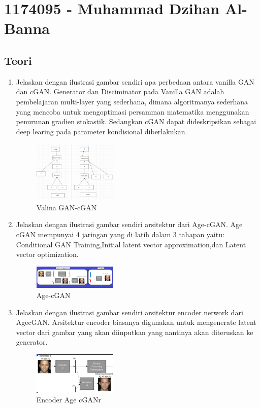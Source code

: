 \section{1174095 - Muhammad Dzihan Al-Banna}

\subsection{Teori}
\begin{enumerate}

        \item Jelaskan dengan ilustrasi gambar sendiri apa perbedaan antara vanilla GAN dan cGAN.
		Generator dan Disciminator pada Vanilla GAN adalah pembelajaran multi-layer yang sederhana, dimana algoritmanya sederhana yang mencoba untuk mengoptimasi persamman matematika menggunakan penurunan gradien stokastik. Sedangkan cGAN dapat dideskripsikan sebagai deep learing pada parameter kondisional diberlakukan.
			\begin{figure}[H]
            	\includegraphics[width=4cm]{figures/1174095/chapter9/teori1.PNG}
           		\centering
           		\caption{Valina GAN-cGAN}
            \end{figure}
            
        \item Jelaskan dengan ilustrasi gambar sendiri arsitektur dari Age-cGAN.
		Age cGAN mempunyai 4 jaringan yang  di latih dalam 3 tahapan yaitu: Conditional GAN Training,Initial latent vector approximation,dan Latent vector optimization.
			\begin{figure}[H]
				\includegraphics[width=4cm]{figures/1174095/chapter9/teori2.PNG}
            		\centering
           		\caption{Age-cGAN}
            \end{figure}
                
        \item Jelaskan dengan ilustrasi gambar sendiri arsitektur encoder network dari AgecGAN.
		Arsitektur encoder biasanya digunakan untuk mengenerate latent vector dari gambar yang akan diinputkan yang nantinya akan diteruskan ke generator.
            \begin{figure}[H]
                \includegraphics[width=4cm]{figures/1174095/chapter9/teori3.PNG}
                    \centering
                \caption{Encoder Age cGANr}
            \end{figure}


\end{enumerate}
